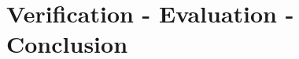 \documentclass[10pt,a4paper,bibliography=totoc]{scrbook}
\begin{document}
  


\part{Verification - Evaluation - Conclusion}


  

  

  


\part{}


  \cleardoublepage
  
	
  \cleardoublepage
  
 


\newpage

\printindex
\end{document}
